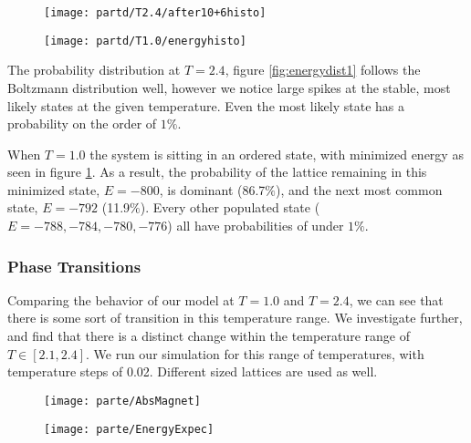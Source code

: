 \documentclass[a4paper]{article}
\begin{document}
\begin{figure}[ht!]
\centering
\begin{minipage}[t]{0.45\textwidth}
\centering
\texttt{[image: partd/T2.4/after10+6histo]}
\label{fig:energydist1}
\end{minipage}
\begin{minipage}[t]{0.45\textwidth}
\centering
\texttt{[image: partd/T1.0/energyhisto]}
\label{energydist2}
\end{minipage}
\end{figure}

The probability distribution at $T=2.4$, figure \ref{fig:energydist1} follows the Boltzmann distribution well, however we notice large spikes at the stable, most likely states at the given temperature. Even the most likely state has a probability on the order of $1\%$.

When $T=1.0$ the system is sitting in an ordered state, with minimized energy as seen in figure \ref{energydist2}. As a result, the probability of the lattice remaining in this minimized state, $E = -800$, is dominant (86.7$\%$), and the next most common state, $E = -792$ (11.9$\%$). Every other populated state ($E = -788, -784,-780,-776$) all have probabilities of under $1\%$.

\clearpage

\subsubsection{Phase Transitions}\label{phaser}
Comparing the behavior of our model at $T=1.0$ and $T=2.4$, we can see that there is some sort of transition in this temperature range. We investigate further, and find that there is a distinct change within the temperature range of $T \in [2.1,2.4]$. We run our simulation for this range of temperatures, with temperature steps of 0.02. Different sized lattices are used as well.

\begin{figure}[ht!]
\centering
\begin{minipage}[t]{0.45\textwidth}
\centering
\texttt{[image: parte/AbsMagnet]}
\end{minipage}
\begin{minipage}[t]{0.45\textwidth}
\centering
\texttt{[image: parte/EnergyExpec]}
\end{minipage}
\end{figure}
\end{document}
